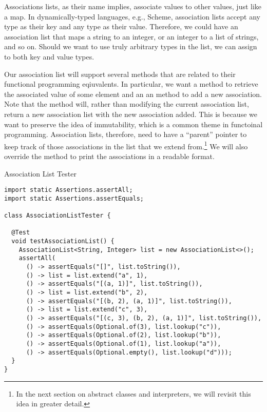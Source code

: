 
Associations lists, as their name implies, associate values to other values, just like a map. In dynamically-typed languages, e.g., Scheme, association lists accept any type as their key and any type as their value. Therefore, we could have an association list that maps a string to an integer, or an integer to a list of strings, and so on. Should we want to use truly arbitrary types in the list, we can assign  to both key and value types.

Our association list will support several methods that are related to their functional programming eqiuvalents. In particular, we want a  method to retrieve the associated value of some element and an an  method to add a new association. Note that the  method will, rather than modifying the current association list, return a new association list with the new association added. This is because we want to preserve the idea of immutability, which is a common theme in functoinal programming. Association lists, therefore, need to have a ``parent'' pointer to keep track of those associations in the list that we extend from.\footnote{In the next section on abstract classes and interpreters, we will revisit this idea in greater detail.} We will also override the  method to print the associations in a readable format. 

\begin{cl}{Association List Tester}
\begin{lstlisting}[language=MyJava]
import static Assertions.assertAll;
import static Assertions.assertEquals;

class AssociationListTester {

  @Test
  void testAssociationList() {
    AssociationList<String, Integer> list = new AssociationList<>();
    assertAll(
      () -> assertEquals("[]", list.toString()),
      () -> list = list.extend("a", 1),
      () -> assertEquals("[(a, 1)]", list.toString()),
      () -> list = list.extend("b", 2),
      () -> assertEquals("[(b, 2), (a, 1)]", list.toString()),
      () -> list = list.extend("c", 3),
      () -> assertEquals("[(c, 3), (b, 2), (a, 1)]", list.toString()),
      () -> assertEquals(Optional.of(3), list.lookup("c")),
      () -> assertEquals(Optional.of(2), list.lookup("b")),
      () -> assertEquals(Optional.of(1), list.lookup("a")),
      () -> assertEquals(Optional.empty(), list.lookup("d")));
  }
}
\end{lstlisting}
\end{cl}

